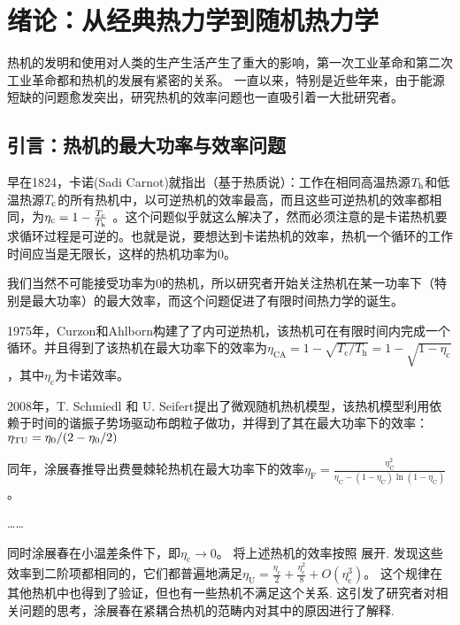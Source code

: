 \chapter{绪论：从经典热力学到随机热力学}
\label{c1}
热机的发明和使用对人类的生产生活产生了重大的影响，第一次工业革命和第二次工业革命都和热机的发展有紧密的关系。 一直以来，特别是近些年来，由于能源短缺的问题愈发突出，研究热机的效率问题也一直吸引着一大批研究者。

\section{引言：热机的最大功率与效率问题}
\qquad 早在1824，卡诺(Sadi Carnot)就指出（基于热质说）\cite{2005}：工作在相同高温热源$T_{\mathrm{h}}$和低温热源$T_{\mathrm{c}}$的所有热机中，以可逆热机的效率最高，而且这些可逆热机的效率都相同，为$\eta _{\text{c}}=1-\frac{T_{\mathrm{c}}}{T_{\mathrm{h}}}$ 。这个问题似乎就这么解决了，然而必须注意的是卡诺热机要求循环过程是可逆的。也就是说，要想达到卡诺热机的效率，热机一个循环的工作时间应当是无限长，这样的热机功率为0。

我们当然不可能接受功率为0的热机，所以研究者开始关注热机在某一功率下（特别是最大功率）的最大效率，而这个问题促进了有限时间热力学的诞生。

1975年，Curzon和Ahlborn构建了了内可逆热机\cite{Curzon1975}，该热机可在有限时间内完成一个循环。并且得到了该热机在最大功率下的效率为$\eta _{\mathrm{CA}}=1-\sqrt{T_{\mathrm{c}}/T_{\mathrm{h}}}=1-\sqrt{1-\eta _{\mathrm{c}}}$ ，其中$\eta _{\mathrm{c}}$为卡诺效率。

2008年，T. Schmiedl 和 U. Seifert提出了微观随机热机模型\cite{Schmiedl2008}，该热机模型利用依赖于时间的谐振子势场驱动布朗粒子做功，并得到了其在最大功率下的效率：$\eta_{\mathrm{TU}}={ \eta_{0}}/{(2-\eta_{0}/2)}$

同年，涂展春推导出费曼棘轮热机\cite{Tu2008}在最大功率下的效率$\eta _{\text{F}}=\frac{\eta _{\text{C}}^{2}}{\eta _{\text{C}}-\left( 1-\eta _{\text{C}} \right) \ln \left( 1-\eta _{\text{C}} \right)}$。 \cite{Tu2020}

……



同时涂展春\cite{Tu2008}在小温差条件下，即$\eta _{\text{c}}\rightarrow 0$。 将上述热机的效率按照 展开. 发现这些效率到二阶项都相同的，它们都普遍地满足$\eta _{\text{U}}=\frac{\eta _{\text{c}}}{2}+\frac{\eta _{\text{c}}^{2}}{8}+O\left( \eta _{\text{c}}^{3} \right)$。 这个规律在其他热机中也得到了验证，但也有一些热机不满足这个关系. 这引发了研究者对相关问题的思考，涂展春在紧耦合热机的范畴内对其中的原因进行了解释.\cite{Tu2020}

